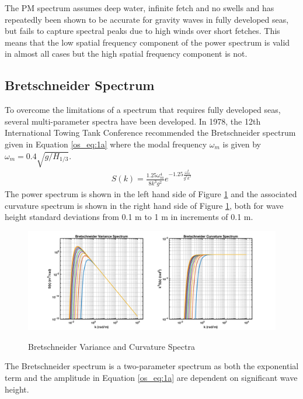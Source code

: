 The PM spectrum assumes deep water, infinite fetch and no swells and has repeatedly been shown to be accurate for gravity waves in fully developed seas, but fails to capture spectral peaks due to high winds over short fetches. This means that the low spatial frequency component of the power spectrum is valid in almost all cases but the high spatial frequency component is not.

\subsection{Bretschneider Spectrum}
To overcome the limitations of a spectrum that requires fully developed seas, several multi-parameter spectra have been developed. In 1978, the 12th International Towing Tank Conference recommended the Bretschneider spectrum \cite{michel_sea_spectra} given in Equation \ref{os_eq:1a} where the modal frequency $\omega_m$ is given by $\omega_m = 0.4\sqrt{g/H_{1/3}}$.
\begin{equation}
  \begin{gathered}
  \label{os_eq:1a}
  S(k) = \frac{1.25 \omega_m^4}{8k^3g^2}e^{-1.25\frac{\omega_m^4}{g^2k^2}} 
  \end{gathered}
\end{equation}
\renewcommand{\baselinestretch}{2} \small\normalsize
The power spectrum is shown in the left hand side of Figure \ref{os_fig:1a} and the associated curvature spectrum is shown in the right hand side of Figure \ref{os_fig:1a}, both for wave height standard deviations from 0.1 m to 1 m in increments of 0.1 m.

 \begin{figure}[H]
  \begin{center}
\includegraphics[width=6in]{../media/Ocean_Surface/bs_variance_curvature_spectrum.png}
  \end{center}
  \renewcommand{\baselinestretch}{1} \small\normalsize
  \begin{quote}
    \caption[Bretschneider Variance and Curvature Spectra]{Bretschneider Variance and Curvature Spectra\label{os_fig:1a}}
  \end{quote}
\end{figure}
 \renewcommand{\baselinestretch}{2} \small\normalsize
The Bretschneider spectrum is a two-parameter spectrum as both the exponential term and the amplitude in Equation \ref{os_eq:1a} are dependent on significant wave height.

